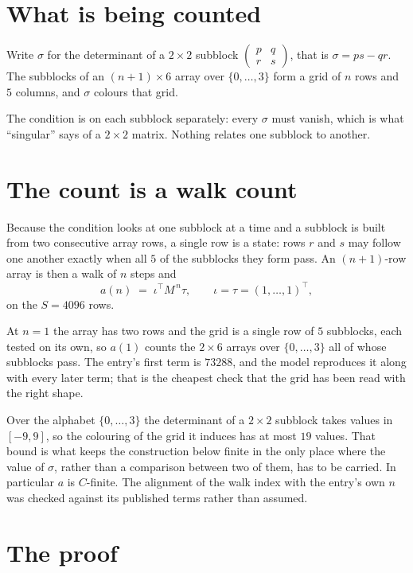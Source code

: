 \documentclass[11pt,a4paper]{article}
\theoremstyle{plain}
\theoremstyle{definition}
\begin{document}
\section{What is being counted}

Write $\sigma$ for the determinant of a $2\times2$ subblock
$\begin{pmatrix}p&q\\r&s\end{pmatrix}$, that is $\sigma=ps-qr$. The subblocks of an
$(n+1)\times6$ array over $\{0,\dots,3\}$ form a grid of $n$ rows and $5$
columns, and $\sigma$ colours that grid.

The condition is on each subblock separately: every $\sigma$ must vanish, which is what
``singular'' says of a $2\times2$ matrix. Nothing
relates one subblock to another.

\section{The count is a walk count}

Because the condition looks at one subblock at a time and a subblock is
built from two consecutive array rows, a single row is a state: rows $r$ and $s$ may follow one
another exactly when all $5$ of the subblocks they form pass. An $(n+1)$-row array is then a
walk of $n$ steps and
\[
a(n)\;=\;\iota^{\!\top}M^{\,n}\tau,\qquad\iota=\tau=(1,\dots,1)^{\!\top},
\]
on the $S=4096$ rows.

At $n=1$ the array has two rows and the grid is a single row of $5$
subblocks, each tested on its own, so $a(1)$ counts the
$2\times6$ arrays over $\{0,\dots,3\}$ all of whose subblocks pass. The entry's
first term is $73288$, and the model reproduces it along with every later term; that is the
cheapest check that the grid has been read with the right shape.

Over the alphabet $\{0,\dots,3\}$ the determinant of a $2\times2$ subblock takes values in
$[-9,9]$, so the colouring of the grid it induces has at most $19$ values.
That bound is what keeps the construction below finite in the only place where the value of
$\sigma$, rather than a comparison between two of them, has to be carried.
In particular $a$ is $C$-finite. The alignment of the walk index with the entry's own $n$ was
checked against its published terms rather than assumed.

\section{The proof}
\end{document}
